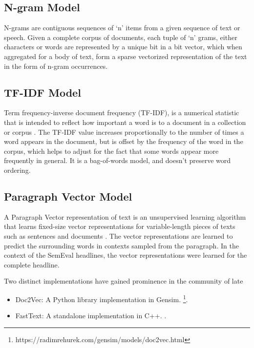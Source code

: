 \documentclass[11pt,a4paper]{article}
\begin{document}
  \subsection{N-gram Model} %
  \label{sub:n_gram_model}
    N-grams are contiguous sequences of `n' items from a given sequence of text or speech. Given a complete corpus of documents, each tuple of `n' grams, either characters or words are represented by a unique bit in a bit vector, which when aggregated for a body of text, form a sparse vectorized representation of the text in the form of n-gram occurrences.
  

  \subsection{TF-IDF Model} %
  \label{sub:tf_idf_model}
    Term frequency-inverse document frequency (TF-IDF), is a numerical statistic that is intended to reflect how important a word is to a document in a collection or corpus \cite{sparck1972statistical}. The TF-IDF value increases proportionally to the number of times a word appears in the document, but is offset by the frequency of the word in the corpus, which helps to adjust for the fact that some words appear more frequently in general. It is a bag-of-words model, and doesn't preserve word ordering.
  

  \subsection{Paragraph Vector Model} %
  \label{sub:paragraph_vectors_doc2vec}

    A Paragraph Vector representation of text is an unsupervised learning algorithm that learns fixed-size vector representations for variable-length pieces of texts such as sentences and documents \cite{le2014distributed}. The vector representations are learned to predict the surrounding words in contexts sampled from the paragraph. In the context of the SemEval headlines, the vector representations were learned for the complete headline.

    Two distinct implementations have gained prominence in the community of late
    \begin{itemize}
      \item 
        Doc2Vec: A Python library implementation in Gensim. \footnote{https://radimrehurek.com/gensim/models/doc2vec.html}.
      \item 
        FastText: A standalone implementation in C++. \cite{bojanowski2016enriching} \cite{joulin2016bag}.
    \end{itemize}
  
\end{document}
